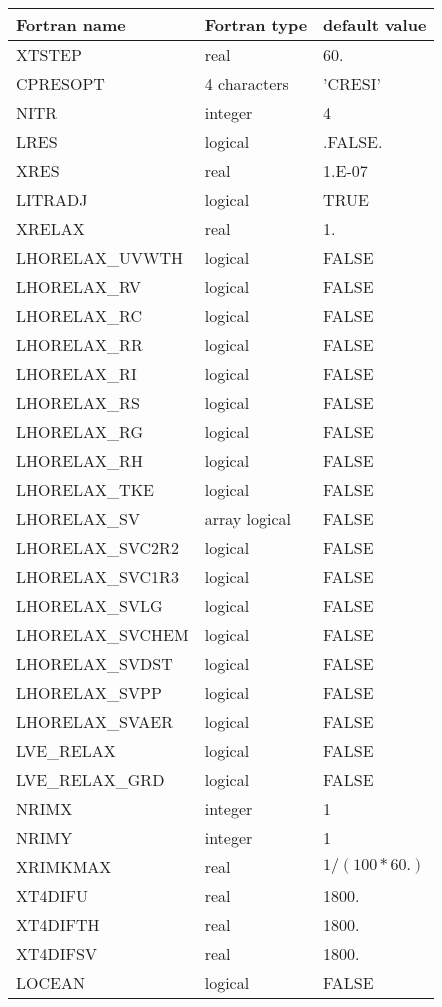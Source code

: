 \begin{longtable} {|p{}|p{}|p{}|}
\hline
Fortran name &  Fortran type & default value \\
\hline 
\endhead
\hline
\endfoot
XTSTEP    & real   & 60.  \\
CPRESOPT  & 4 characters  & 'CRESI'  \\
NITR      & integer   & 4   \\
LRES        & logical        & .FALSE. \\
XRES        & real           & 1.E-07  \\
LITRADJ   & logical   & TRUE  \\
XRELAX    & real     & 1.   \\
LHORELAX\_UVWTH &  logical  & FALSE  \\
LHORELAX\_RV &  logical  & FALSE  \\
LHORELAX\_RC &  logical  & FALSE  \\
LHORELAX\_RR &  logical  & FALSE  \\
LHORELAX\_RI &  logical  & FALSE  \\
LHORELAX\_RS &  logical  & FALSE  \\
LHORELAX\_RG &  logical  & FALSE  \\
LHORELAX\_RH &  logical  & FALSE  \\
LHORELAX\_TKE &  logical  & FALSE  \\
LHORELAX\_SV & array logical & FALSE  \\
LHORELAX\_SVC2R2 &   logical & FALSE  \\
LHORELAX\_SVC1R3 &   logical & FALSE  \\
LHORELAX\_SVLG   &   logical & FALSE  \\
LHORELAX\_SVCHEM &   logical & FALSE  \\
LHORELAX\_SVDST  &   logical & FALSE  \\
LHORELAX\_SVPP   &   logical & FALSE  \\
LHORELAX\_SVAER  &   logical & FALSE  \\
LVE\_RELAX&  logical  & FALSE  \\
LVE\_RELAX\_GRD&  logical  & FALSE  \\
NRIMX     & integer   & 1   \\
NRIMY     & integer   & 1   \\
XRIMKMAX  &  real     & $1 / (100*60.) $ \\
XT4DIFU   &  real     & 1800.  \\
XT4DIFTH  &  real     & 1800.  \\
XT4DIFSV  &  real     & 1800.  \\
LOCEAN    &  logical  & FALSE \\
\end{longtable}

